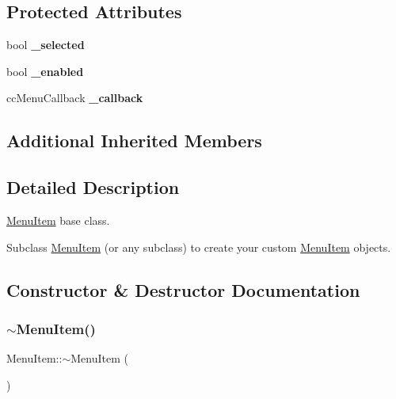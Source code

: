 \subsection*{Protected Attributes}
\begin{DoxyCompactItemize}
\item 
\mbox{\label{classMenuItem_a46a1b6cddc464b349863db1cd6670c9c}} 
bool {\bfseries \+\_\+selected}
\item 
\mbox{\label{classMenuItem_a5c1716a502b373cc2880c541e45e716b}} 
bool {\bfseries \+\_\+enabled}
\item 
\mbox{\label{classMenuItem_aa623dda6a47eab4ed5c13f44b1d5ff03}} 
cc\+Menu\+Callback {\bfseries \+\_\+callback}
\end{DoxyCompactItemize}
\subsection*{Additional Inherited Members}


\subsection{Detailed Description}
\hyperlink{classMenuItem}{Menu\+Item} base class. 

Subclass \hyperlink{classMenuItem}{Menu\+Item} (or any subclass) to create your custom \hyperlink{classMenuItem}{Menu\+Item} objects. 

\subsection{Constructor \& Destructor Documentation}
\mbox{\label{classMenuItem_a41c6086a4d066256ecb7bfa715059ea2}} 
\subsubsection{\texorpdfstring{$\sim$\+Menu\+Item()}{~MenuItem()}\hspace{0.1cm}{\footnotesize\ttfamily [1/2]}}
{\footnotesize\ttfamily Menu\+Item\+::$\sim$\+Menu\+Item (\begin{DoxyParamCaption}{ }\end{DoxyParamCaption})\hspace{0.3cm}{\ttfamily [virtual]}}


